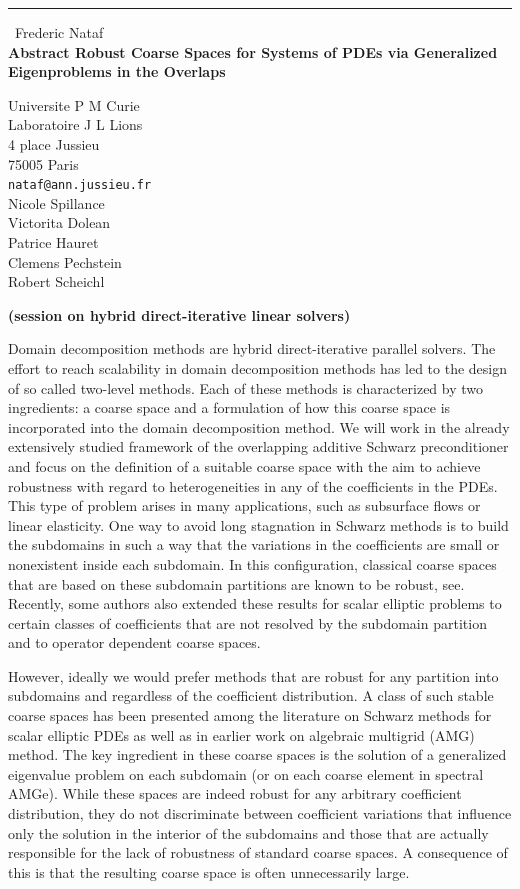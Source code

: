 \documentclass{report}
\begin{document}
\begin{center}
\rule{6in}{1pt} \
{\large Frederic Nataf \\
{\bf Abstract Robust Coarse Spaces for Systems of PDEs via {Gen}eralized {E}igenproblems in the {O}verlaps}}

Universite P M Curie \\ Laboratoire J L Lions \\ 4 place Jussieu \\ 75005 Paris
\\
{\tt nataf@ann.jussieu.fr}\\
Nicole Spillance\\
Victorita Dolean\\
Patrice Hauret\\
Clemens Pechstein\\
Robert Scheichl\end{center}

{\bf (session on hybrid direct-iterative linear solvers)}

Domain decomposition methods are hybrid direct-iterative parallel
solvers. The effort to reach scalability in domain decomposition methods
has led to the design of so called two-level methods. Each of these
methods is characterized by two ingredients: a coarse space and a
formulation of how this coarse space is incorporated into the domain
decomposition method. We will work in the already extensively studied
framework of the overlapping additive Schwarz preconditioner and focus on
the definition of a suitable coarse space with the aim to achieve
robustness with regard to heterogeneities in any of the coefficients in
the PDEs. This type of problem arises in many applications, such as
subsurface flows or linear elasticity. One way to avoid long stagnation
in Schwarz methods is to build the subdomains in such a way that the
variations in the coefficients are small or nonexistent inside each
subdomain. In this configuration, classical coarse spaces that are based
on these subdomain partitions are known to be robust, see. Recently, some
authors also extended these results for scalar elliptic problems to
certain classes of coefficients that are not resolved by the subdomain
partition and to operator dependent coarse spaces.

However, ideally we would prefer methods that are robust for any
partition into subdomains and regardless of the coefficient distribution.
A class of such stable coarse spaces has been presented among the
literature on Schwarz methods for scalar elliptic PDEs as well as in
earlier work on algebraic multigrid (AMG) method. The key ingredient in
these coarse spaces is the solution of a generalized eigenvalue problem
on each subdomain (or on each coarse element in spectral AMGe). While
these spaces are indeed robust for any arbitrary coefficient
distribution, they do not discriminate between coefficient variations
that influence only the solution in the interior of the subdomains and
those that are actually responsible for the lack of robustness of
standard coarse spaces. A consequence of this is that the resulting
coarse space is often unnecessarily large.\\
\end{document}
